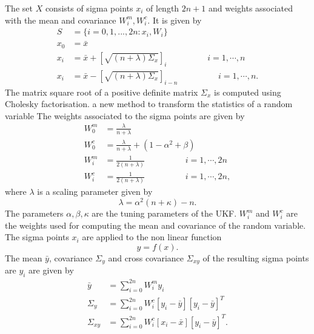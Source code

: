 The set $X$ consists of sigma points $x_i$ of length $2n+1$ and weights associated with the mean and covariance $W_i^m, W_i^c $. It is given by \citep{sim07} 
\begin{equation} 
    \label{eq:ut_sigma}
    \begin{split}
    S &= \{i= 0,1,...,2n:x_i,W_i \} \\
    x_0 &= \bar x \\ 
    x_i &= \bar x + \left[ \sqrt{(n+\lambda)\Sigma_x} \right ]_i \hspace{2cm} i = 1, \cdots ,n \\
    x_i &= \bar x - \left[ \sqrt{(n+\lambda)\Sigma_x} \right ]_{i-n} \hspace{2cm} i = 1, \cdots ,n . 
    \end{split}
\end{equation}
The matrix square root of a positive definite matrix $\Sigma_x$ is computed using Cholesky factorisation. 
a new method to transform the statistics of a random variable
The weights associated to the sigma points are given by 
\begin{equation}
    \label{eq:ut_weights}
    \begin{split}
    W_0^m &= \frac{\lambda}{n+\lambda} \\
    W_0^c &= \frac{\lambda}{n+\lambda} + ( 1 - \alpha^2 + \beta)\\
    W_i^m &= \frac{1}{2(n+\lambda)} \hspace{2cm} i = 1, \cdots, 2n \\
    W_i^c &= \frac{1}{2(n+\lambda)} \hspace{2cm} i = 1, \cdots, 2n ,
    \end{split}
\end{equation} 
where $\lambda$ is a scaling parameter given by $$ \lambda = \alpha^2(n+\kappa)-n. $$ The parameters $\alpha,\beta,\kappa$ are the tuning parameters of the UKF. $W_i^m$ and $W_i^c$ are the weights used for computing the mean and covariance of the random variable.
The sigma points $x_i$ are applied to the non linear function $$y= f(x).$$ The mean $\bar y$, covariance $\Sigma_y$ and cross covariance $\Sigma_{xy}$ of the resulting sigma points are $y_i$ are given by
\begin{equation}
    \label{eq:ut_mean_cov}
    \begin{split}
        \bar y &= \sum \limits_{i=0}^{2n} W_i^m y_i \\
        \Sigma_y &= \sum \limits_{i=0}^{2n} W_i^c [y_i - \bar y ] [ y_i - \bar y] ^T \\
        \Sigma_{xy} &= \sum \limits_{i=0}^{2n} W_i^c [x_i - \bar x ] [ y_i - \bar y] ^T .
    \end{split}
\end{equation}

